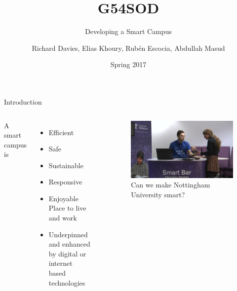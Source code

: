 \documentclass[18pt]{beamer}
\title{G54SOD}
\subtitle{Developing a Smart Campus}
\date{Spring 2017}
\author{Richard Davies, Elias Khoury, Rub\'{e}n Escocia, Abdullah Masud}
\institute{The University of Nottingham}
\begin{document}
    \graphicspath{ {images/} }
    \maketitle

    \begin{frame}{Introduction}
        \begin{columns}
                A smart campus is
                \begin{itemize}
                    \item Efficient
                    \item Safe
                    \item Sustainable
                    \item Responsive
                    \item Enjoyable Place to live and work
                    \item Underpinned and enhanced by digital or internet based technologies
                \end{itemize} \cite{Misc:uonsmartcampus}
                \begin{figure}
                \includegraphics[width=0.99\columnwidth]{smart}
                \caption{Can we make Nottingham University smart?}
                \end{figure}
        \end{columns}
    \end{frame}
\end{document}
